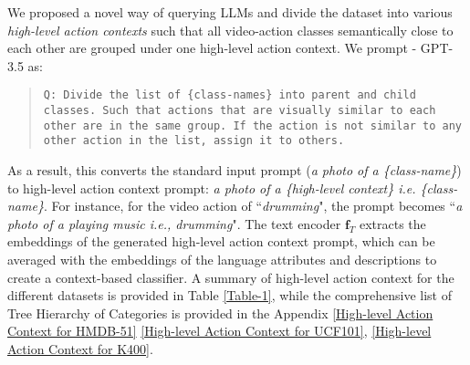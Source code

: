 \documentclass{article} \usepackage{iclr2024_conference,times}
\begin{document}
We proposed a novel way of querying LLMs and divide the dataset into various \emph{high-level action contexts}  such that all video-action classes semantically close to each other are grouped under one high-level action context. We prompt - GPT-3.5 as:
     \begin{quotation}
\centering \begin{minipage}{0.9\linewidth} {\texttt{Q: Divide the list of {\{class-names}\} into parent and child classes. Such that actions that are visually similar to each other are in the same group. If the action is not similar to any other action in the list, assign it to others.}} 
    \newline
\end{minipage}
\end{quotation}
As a result, this converts the standard input prompt (\emph{a photo of a {\{class-name}\}}) to high-level action context prompt: \emph{a photo of a {\{high-level context}\} i.e. {\{class-name}\}}. For instance, for the video action of ``\emph{drumming}", the prompt becomes ``\emph{a photo of a playing music i.e., drumming}". The text encoder $\bm{f}_{T}$ extracts the embeddings of the generated high-level action context prompt, which can be averaged with the embeddings of the language attributes and descriptions to create a context-based classifier. 
A summary of high-level action context for the different datasets is provided in Table \ref {Table-1}, while the comprehensive list of Tree Hierarchy of Categories is provided in the Appendix \ref{High-level Action Context for HMDB-51} \ref{High-level Action Context for UCF101}, \ref{High-level Action Context for K400}.
\end{document}
